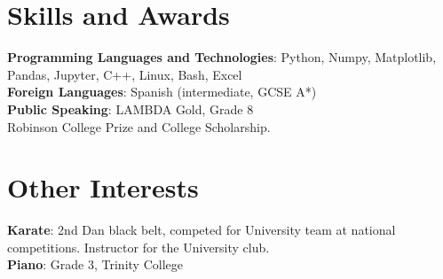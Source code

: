 \documentclass[a4paper,11pt]{article}
\begin{document}
\section{Skills and Awards}
\begin{itemize}[leftmargin=0.15in, label={}]
    \normalsize{\item{
     \textbf{Programming Languages and Technologies}{: Python, Numpy, Matplotlib, Pandas, Jupyter, C++, Linux, Bash, Excel} \\
     \textbf{Foreign Languages}{: Spanish (intermediate, GCSE A*)}\\
     \textbf{Public Speaking}{: LAMBDA Gold, Grade 8} \\
     Robinson College Prize and College Scholarship.
    }}
 \end{itemize}
 
\section{Other Interests}
\begin{itemize}[leftmargin=0.15in, label={}]
    \normalsize{\item{
     \textbf{Karate}{: 2nd Dan black belt, competed for University team at national competitions. Instructor for the University club.} \\
      \textbf{Piano}{: Grade 3, Trinity College}
    }}    
 \end{itemize}
\end{document}
